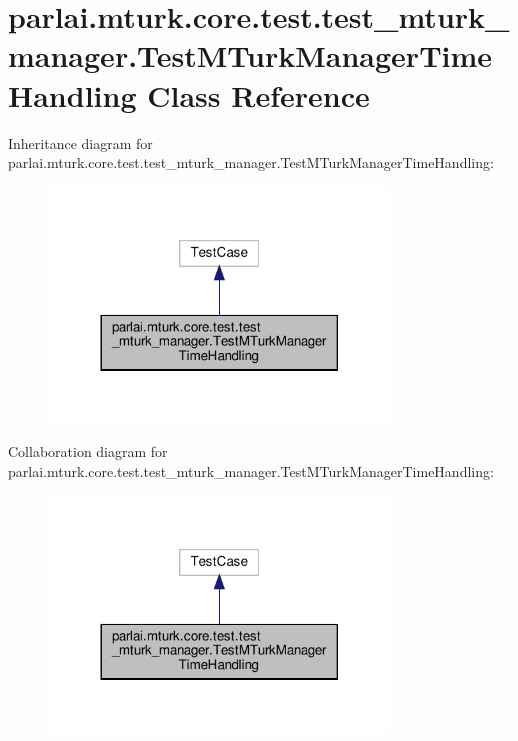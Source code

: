 \hypertarget{classparlai_1_1mturk_1_1core_1_1test_1_1test__mturk__manager_1_1TestMTurkManagerTimeHandling}{}\section{parlai.\+mturk.\+core.\+test.\+test\+\_\+mturk\+\_\+manager.\+Test\+M\+Turk\+Manager\+Time\+Handling Class Reference}
\label{classparlai_1_1mturk_1_1core_1_1test_1_1test__mturk__manager_1_1TestMTurkManagerTimeHandling}


Inheritance diagram for parlai.\+mturk.\+core.\+test.\+test\+\_\+mturk\+\_\+manager.\+Test\+M\+Turk\+Manager\+Time\+Handling\+:\nopagebreak
\begin{figure}[H]
\begin{center}
\leavevmode
\includegraphics[width=257pt]{d8/d5d/classparlai_1_1mturk_1_1core_1_1test_1_1test__mturk__manager_1_1TestMTurkManagerTimeHandling__inherit__graph}
\end{center}
\end{figure}


Collaboration diagram for parlai.\+mturk.\+core.\+test.\+test\+\_\+mturk\+\_\+manager.\+Test\+M\+Turk\+Manager\+Time\+Handling\+:\nopagebreak
\begin{figure}[H]
\begin{center}
\leavevmode
\includegraphics[width=257pt]{d5/d49/classparlai_1_1mturk_1_1core_1_1test_1_1test__mturk__manager_1_1TestMTurkManagerTimeHandling__coll__graph}
\end{center}
\end{figure}
